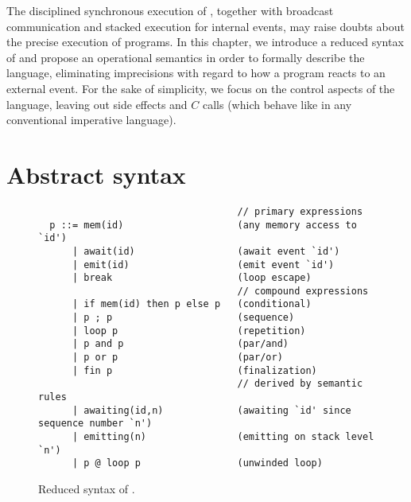 %

The disciplined synchronous execution of \CEU, together with broadcast 
communication and stacked execution for internal events, may raise doubts about 
the precise execution of programs.
%
In this chapter, we introduce a reduced syntax of \CEU and propose an 
operational semantics in order to formally describe the language, eliminating 
imprecisions with regard to how a program reacts to an external event.
%
For the sake of simplicity, we focus on the control aspects of the language, 
leaving out side effects and $C$ calls (which behave like in any conventional 
imperative language).



\section{Abstract syntax}
\label{sec.sem.syntax}

\begin{figure}[h]
{\small
\begin{verbatim}
                                   // primary expressions
  p ::= mem(id)                    (any memory access to `id')
      | await(id)                  (await event `id')
      | emit(id)                   (emit event `id')
      | break                      (loop escape)
                                   // compound expressions
      | if mem(id) then p else p   (conditional)
      | p ; p                      (sequence)
      | loop p                     (repetition)
      | p and p                    (par/and)
      | p or p                     (par/or)
      | fin p                      (finalization)
                                   // derived by semantic rules
      | awaiting(id,n)             (awaiting `id' since sequence number `n')
      | emitting(n)                (emitting on stack level `n')
      | p @ loop p                 (unwinded loop)
\end{verbatim}
}%
\caption{
    Reduced syntax of \CEU.
\label{lst.formal.syntax}
}
\end{figure}

